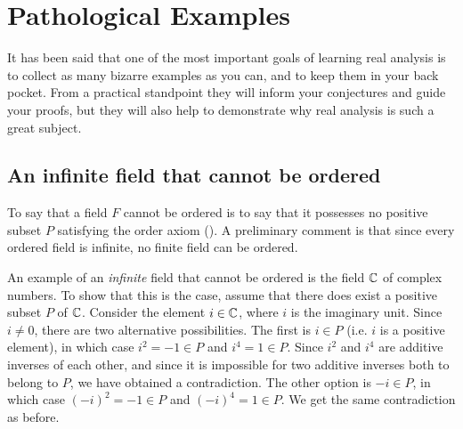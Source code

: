 \chapter{Pathological Examples}
It has been said that one of the most important goals of learning
real analysis is to collect as many bizarre examples as you can, and
to keep them in your back pocket. From a practical standpoint they
will inform your conjectures and guide your proofs, but they will
also help to demonstrate why real analysis is such a great subject.

\section{An infinite field that cannot be ordered}
To say that a field $F$ cannot be ordered is to say that it possesses
no positive subset $P$ satisfying the order axiom
(). A preliminary comment is that since every
ordered field is infinite, no finite field can be ordered.

An example of an \textit{infinite} field that cannot be ordered is
the field $\mathbb C$ of complex numbers. To show that this is the case,
assume that there does exist a positive subset $P$ of $\mathbb C$. Consider
the element $i \in \mathbb C$, where $i$ is the imaginary unit. Since $i \neq
0$, there are two alternative possibilities. The first is $i \in P$
(i.e. $i$ is a positive element), in which case $i^2 = -1 \in P$ and
$i^4 = 1 \in P$. Since $i^2$ and $i^4$ are additive inverses of each
other, and since it is impossible for two additive inverses both to
belong to $P$, we have obtained a contradiction. The other option is
$-i \in P$, in which case $(-i)^2 = -1 \in P$ and $(-i)^4 = 1 \in P$.
We get the same contradiction as before.
